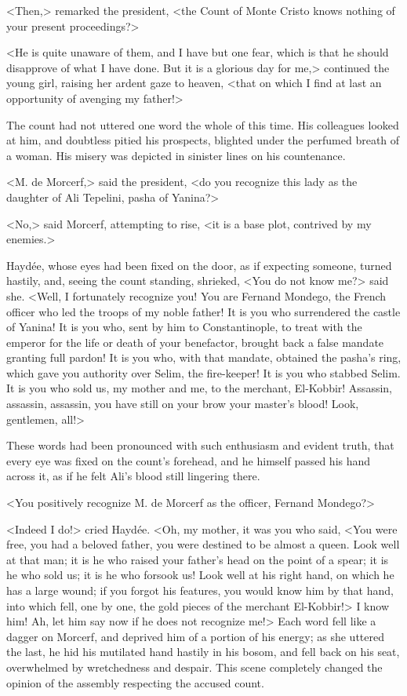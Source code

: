 <Then,> remarked the president, <the Count of Monte Cristo knows nothing of your present proceedings?>

<He is quite unaware of them, and I have but one fear, which is that he should disapprove of what I have done. But it is a glorious day for me,> continued the young girl, raising her ardent gaze to heaven, <that on which I find at last an opportunity of avenging my father!> 

The count had not uttered one word the whole of this time. His colleagues looked at him, and doubtless pitied his prospects, blighted under the perfumed breath of a woman. His misery was depicted in sinister lines on his countenance. 

<M. de Morcerf,> said the president, <do you recognize this lady as the daughter of Ali Tepelini, pasha of Yanina?>

<No,> said Morcerf, attempting to rise, <it is a base plot, contrived by my enemies.> 

Haydée, whose eyes had been fixed on the door, as if expecting someone, turned hastily, and, seeing the count standing, shrieked, <You do not know me?> said she. <Well, I fortunately recognize you! You are Fernand Mondego, the French officer who led the troops of my noble father! It is you who surrendered the castle of Yanina! It is you who, sent by him to Constantinople, to treat with the emperor for the life or death of your benefactor, brought back a false mandate granting full pardon! It is you who, with that mandate, obtained the pasha's ring, which gave you authority over Selim, the fire-keeper! It is you who stabbed Selim. It is you who sold us, my mother and me, to the merchant, El-Kobbir! Assassin, assassin, assassin, you have still on your brow your master's blood! Look, gentlemen, all!> 

These words had been pronounced with such enthusiasm and evident truth, that every eye was fixed on the count's forehead, and he himself passed his hand across it, as if he felt Ali's blood still lingering there. 

<You positively recognize M. de Morcerf as the officer, Fernand Mondego?>

<Indeed I do!> cried Haydée. <Oh, my mother, it was you who said, <You were free, you had a beloved father, you were destined to be almost a queen. Look well at that man; it is he who raised your father's head on the point of a spear; it is he who sold us; it is he who forsook us! Look well at his right hand, on which he has a large wound; if you forgot his features, you would know him by that hand, into which fell, one by one, the gold pieces of the merchant El-Kobbir!> I know him! Ah, let him say now if he does not recognize me!> Each word fell like a dagger on Morcerf, and deprived him of a portion of his energy; as she uttered the last, he hid his mutilated hand hastily in his bosom, and fell back on his seat, overwhelmed by wretchedness and despair. This scene completely changed the opinion of the assembly respecting the accused count. 

